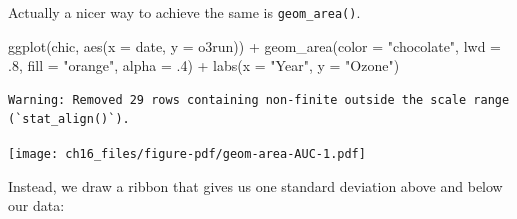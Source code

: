 \documentclass[
  letterpaper,
]{scrbook}
\newenvironment{Shaded}{\begin{snugshade}}{\end{snugshade}}
\newcommand{\AttributeTok}[1]{\textcolor[rgb]{0.40,0.45,0.13}{#1}}
\newcommand{\DecValTok}[1]{\textcolor[rgb]{0.68,0.00,0.00}{#1}}
\newcommand{\FunctionTok}[1]{\textcolor[rgb]{0.28,0.35,0.67}{#1}}
\newcommand{\NormalTok}[1]{\textcolor[rgb]{0.00,0.23,0.31}{#1}}
\newcommand{\SpecialCharTok}[1]{\textcolor[rgb]{0.37,0.37,0.37}{#1}}
\newcommand{\StringTok}[1]{\textcolor[rgb]{0.13,0.47,0.30}{#1}}
\begin{document}
\begin{tcolorbox}[enhanced jigsaw, toprule=.15mm, bottomtitle=1mm, coltitle=black, breakable, colbacktitle=quarto-callout-tip-color!10!white, opacityback=0, toptitle=1mm, colframe=quarto-callout-tip-color-frame, titlerule=0mm, title=\textcolor{quarto-callout-tip-color}{\faLightbulb}\hspace{0.5em}{Using \texttt{geom\_area()}}, bottomrule=.15mm, arc=.35mm, opacitybacktitle=0.6, leftrule=.75mm, left=2mm, rightrule=.15mm, colback=white]

Actually a nicer way to achieve the same is \texttt{geom\_area()}.

\begin{Shaded}
\begin{Highlighting}[]
\FunctionTok{ggplot}\NormalTok{(chic, }\FunctionTok{aes}\NormalTok{(}\AttributeTok{x =}\NormalTok{ date, }\AttributeTok{y =}\NormalTok{ o3run)) }\SpecialCharTok{+}
   \FunctionTok{geom\_area}\NormalTok{(}\AttributeTok{color =} \StringTok{"chocolate"}\NormalTok{, }\AttributeTok{lwd =}\NormalTok{ .}\DecValTok{8}\NormalTok{,}
             \AttributeTok{fill =} \StringTok{"orange"}\NormalTok{, }\AttributeTok{alpha =}\NormalTok{ .}\DecValTok{4}\NormalTok{) }\SpecialCharTok{+}
   \FunctionTok{labs}\NormalTok{(}\AttributeTok{x =} \StringTok{"Year"}\NormalTok{, }\AttributeTok{y =} \StringTok{"Ozone"}\NormalTok{)}
\end{Highlighting}
\end{Shaded}

\begin{verbatim}
Warning: Removed 29 rows containing non-finite outside the scale range
(`stat_align()`).
\end{verbatim}

\texttt{[image: ch16\_files/figure-pdf/geom-area-AUC-1.pdf]}

\end{tcolorbox}

Instead, we draw a ribbon that gives us one standard deviation above and
below our data:
\end{document}

